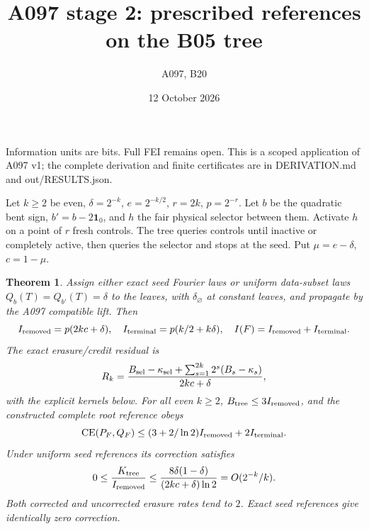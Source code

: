 \documentclass[11pt]{article}
\newtheorem{theorem}{Theorem}
\begin{document}
\title{A097 stage 2: prescribed references on the B05 tree}
\author{A097, B20}\date{12 October 2026}\maketitle
Information units are bits. Full FEI remains open. This is a scoped
application of A097 v1; the complete derivation and finite certificates are
in DERIVATION.md and out/RESULTS.json.

Let $k\ge2$ be even, $\delta=2^{-k}$, $e=2^{-k/2}$, $r=2k$, $p=2^{-r}$.
Let $b$ be the quadratic bent sign, $b'=b-2\mathbf1_0$, and $h$ the fair
physical selector between them. Activate $h$ on a point of $r$ fresh controls.
The tree queries controls until inactive or completely active, then queries
the selector and stops at the seed. Put $\mu=e-\delta$, $c=1-\mu$.

\begin{theorem}
Assign either exact seed Fourier laws or uniform data-subset laws
$Q_b(T)=Q_{b'}(T)=\delta$ to the leaves, with $\delta_\varnothing$ at constant
leaves, and propagate by the A097 compatible lift. Then
\[
 I_{\rm removed}=p(2kc+\delta),\quad
 I_{\rm terminal}=p(k/2+k\delta),\quad I(F)=I_{\rm removed}+I_{\rm terminal}.
\]
The exact erasure/credit residual is
\[
 R_k=\frac{B_{\rm sel}-\kappa_{\rm sel}+
     \sum_{s=1}^{2k}2^s(B_s-\kappa_s)}{2kc+\delta},
\]
with the explicit kernels below. For all even $k\ge2$,
$B_{\rm tree}\le3 I_{\rm removed}$, and the constructed complete root
reference obeys
\[
 \operatorname{CE}(P_F,Q_F)\le(3+2/\ln2)I_{\rm removed}+2I_{\rm terminal}.
\]
Under uniform seed references its correction satisfies
\[
 0\le\frac{K_{\rm tree}}{I_{\rm removed}}
 \le\frac{8\delta(1-\delta)}{(2kc+\delta)\ln2}=O(2^{-k}/k).
\]
Both corrected and uncorrected erasure rates tend to $2$. Exact seed
references give identically zero correction.
\end{theorem}
\end{document}
